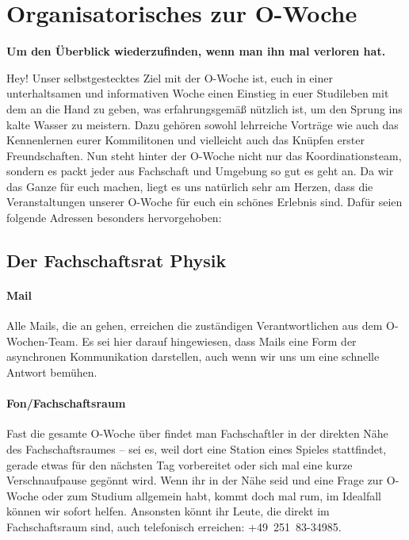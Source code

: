 \newcommand{\fibelvp}[2]{
	\minipage{0.24\textwidth}
		\begin{centering}
			\texttt{[image: \#1]}
			\textbf{#2}
		\end{centering}
	\endminipage\hfill
}

\section{Organisatorisches zur O-Woche}
\textbf{Um den Überblick wiederzufinden, wenn man ihn mal verloren hat.}

Hey! Unser selbstgestecktes Ziel mit der O-Woche ist, euch in einer unterhaltsamen und informativen Woche einen
Einstieg in euer Studileben mit dem an die Hand zu geben, was erfahrungsgemäß nützlich ist, um den Sprung ins kalte Wasser
zu meistern. Dazu gehören sowohl lehrreiche Vorträge wie auch das Kennenlernen eurer Kommilitonen und vielleicht auch
das Knüpfen erster Freundschaften. Nun steht hinter der O-Woche nicht nur das Koordinationsteam, sondern es packt jeder
aus Fachschaft und Umgebung so gut es geht an. Da wir das Ganze für euch machen, liegt es uns natürlich sehr am Herzen,
dass die Veranstaltungen unserer O-Woche für euch ein schönes Erlebnis sind. Dafür seien folgende Adressen
besonders hervorgehoben:

\subsection{Der Fachschaftsrat Physik}
\paragraph{Mail}
Alle Mails, die an  gehen, erreichen die zuständigen Verantwortlichen aus dem
O-Wochen-Team. Es sei hier darauf hingewiesen, dass Mails eine Form der asynchronen Kommunikation darstellen,
auch wenn wir uns um eine schnelle Antwort bemühen.

\paragraph{Fon/Fachschaftsraum}
Fast die gesamte O-Woche über findet man Fachschaftler in der direkten Nähe des Fachschaftsraumes -- sei es, weil
dort eine Station eines Spieles stattfindet, gerade etwas für den nächsten Tag vorbereitet oder sich mal eine kurze
Verschnaufpause gegönnt wird. Wenn ihr in der Nähe seid und eine Frage zur O-Woche oder zum Studium allgemein habt,
kommt doch mal rum, im Idealfall können wir sofort helfen. Ansonsten könnt ihr Leute, die direkt im Fachschaftsraum
sind, auch telefonisch erreichen: +49~251~83-34985.

